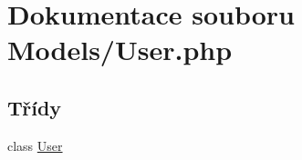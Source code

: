 \hypertarget{_user_8php}{\section{Dokumentace souboru Models/\-User.php}
\label{_user_8php}
}
\subsection*{Třídy}
\begin{DoxyCompactItemize}
\item 
class \hyperlink{class_user}{User}
\end{DoxyCompactItemize}
